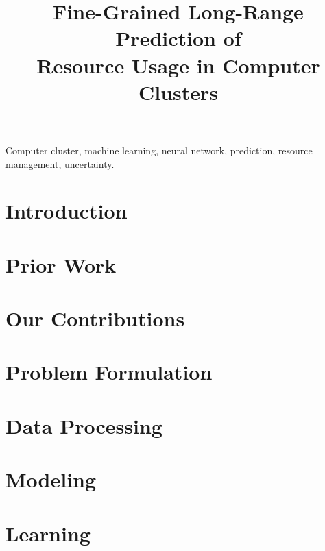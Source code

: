\documentclass[journal]{IEEEtran}
\title{
  Fine-Grained Long-Range Prediction of\\
  Resource Usage in Computer Clusters
}
\author{}
\begin{document}
  \maketitle

  \begin{abstract}
    
  \end{abstract}

  \begin{IEEEkeywords}
    Computer cluster,
    machine learning,
    neural network,
    prediction,
    resource management,
    uncertainty.
  \end{IEEEkeywords}


  \section{Introduction} 
  

  
  \section{Prior Work} 
  

  \section{Our Contributions} 
  

  \section{Problem Formulation} 
  

  \section{Data Processing} 
  

  \section{Modeling} 
  

  \section{Learning} 
  
\end{document}
